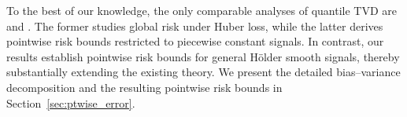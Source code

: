\documentclass[11pt]{article}
\theoremstyle{plain}
\theoremstyle{definition}
\theoremstyle{remark}
\begin{document}
To the best of our knowledge, the only comparable analyses of quantile TVD are \cite{madrid2022risk} and \cite{zhang2023element}. The former studies global risk under Huber loss, while the latter derives pointwise risk bounds restricted to piecewise constant signals. In contrast, our results establish pointwise risk bounds for general H\"older smooth signals, thereby substantially extending the existing theory. We present the detailed bias--variance decomposition and the resulting pointwise risk bounds in Section~\ref{sec:ptwise_error}.

\end{document}
